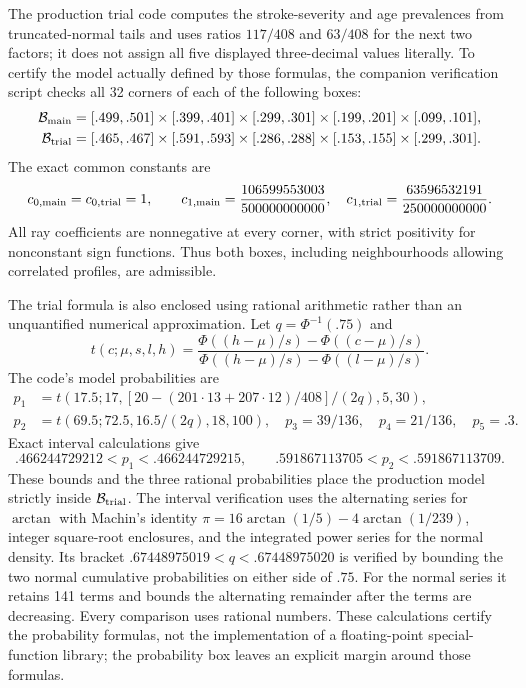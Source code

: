 \documentclass[12pt,a4paper]{article}
\theoremstyle{definition}
\theoremstyle{remark}\newtheorem{remark}{Remark}
\numberwithin{equation}{section}
\begin{document}
The production trial code computes the stroke-severity and age prevalences from truncated-normal tails and uses ratios $117/408$ and $63/408$ for the next two factors; it does not assign all five displayed three-decimal values literally. To certify the model actually defined by those formulas, the companion verification script checks all 32 corners of each of the following boxes:
\begin{align*}
 \mathcal B_{\rm main}={}&[.499,.501]\times[.399,.401]\times[.299,.301]
                       \times[.199,.201]\times[.099,.101],\\
 \mathcal B_{\rm trial}={}&[.465,.467]\times[.591,.593]\times[.286,.288]
                        \times[.153,.155]\times[.299,.301].
\end{align*}
The exact common constants are
\[
 c_{0,\rm main}=c_{0,\rm trial}=1,\qquad
 c_{1,\rm main}=\frac{106599553003}{500000000000},\quad
 c_{1,\rm trial}=\frac{63596532191}{250000000000}.
\]
All ray coefficients are nonnegative at every corner, with strict positivity for nonconstant sign functions. Thus both boxes, including neighbourhoods allowing correlated profiles, are admissible.

The trial formula is also enclosed using rational arithmetic rather than an unquantified numerical approximation. Let $q=\Phi^{-1}(.75)$ and
\[
 t(c;\mu,s,l,h)=\frac{\Phi((h-\mu)/s)-\Phi((c-\mu)/s)}
                         {\Phi((h-\mu)/s)-\Phi((l-\mu)/s)}.
\]
The code's model probabilities are
\begin{align*}
 p_1&=t(17.5;17,[20-(201\cdot13+207\cdot12)/408]/(2q),5,30),\\
 p_2&=t(69.5;72.5,16.5/(2q),18,100),\quad
 p_3=39/136,\quad p_4=21/136,\quad p_5=.3.
\end{align*}
Exact interval calculations give
\[
 .466244729212<p_1<.466244729215,\qquad
 .591867113705<p_2<.591867113709.
\]
These bounds and the three rational probabilities place the production model strictly inside $\mathcal B_{\rm trial}$. The interval verification uses the alternating series for $\arctan$ with Machin's identity $\pi=16\arctan(1/5)-4\arctan(1/239)$, integer square-root enclosures, and the integrated power series for the normal density. Its bracket $.67448975019<q<.67448975020$ is verified by bounding the two normal cumulative probabilities on either side of $.75$. For the normal series it retains 141 terms and bounds the alternating remainder after the terms are decreasing. Every comparison uses rational numbers. These calculations certify the probability formulas, not the implementation of a floating-point special-function library; the probability box leaves an explicit margin around those formulas.
\end{document}
